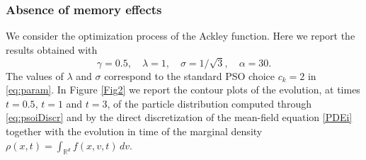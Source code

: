 \documentclass{ims9x6}
\newcommand{\RR}{\mathbb{R}}
\begin{document}
\subsubsection{Absence of memory effects}
We consider the optimization process of the Ackley function. Here we report the results obtained with
\begin{equation}
\gamma = 0.5,\quad  \lambda = 1, \quad \sigma= {1}/{\sqrt{3}},\quad \alpha = 30.
\label{eq:paramt} 
\end{equation}
The values of $\lambda$ and $\sigma$ correspond to the standard PSO choice $c_k = 2 $ in \eqref{eq:param}. In Figure \ref{Fig2} we report the contour plots of the evolution, at times $ t = 0.5 $, $ t = 1 $ and $ t = 3 $, of the particle distribution computed through \eqref{eq:psoiDiscr} and by the direct discretization of the mean-field equation \eqref{PDEi} together with the evolution in time of the marginal density $\rho(x,t) = \int_{\RR^d} f(x,v,t)\,dv$.  
\end{document}
